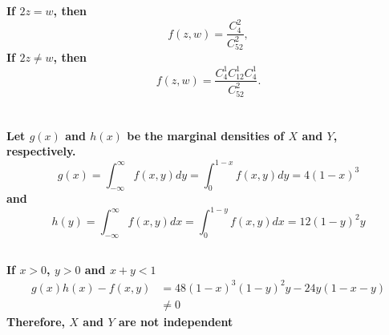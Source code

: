 \documentclass{article}
\begin{document}
    \section{}
        \subsection{}
            \paragraph{
                If $2z=w$, then 
                $$f(z,w)=\frac{C_4^2}{C_{52} ^2},$$
                If $2z \neq w$, then
                $$f(z,w)=\frac{C_4^1C_{12}^1C_4^1}{C_{52}^2}.$$
            }
    
    \section{}
        \subsection{}
            \paragraph{
                Let $g(x)$ and $h(x)$ be the marginal densities of $X$ and $Y$, respectively.
                $$g(x)=\int _{-\infty} ^\infty f(x,y) dy=\int _0 ^{1-x} f(x,y)dy=4(1-x)^3$$
                and
                $$h(y)=\int _{-\infty} ^\infty f(x,y) dx = \int _0 ^{1-y} f(x,y) dx=12(1-y)^2y$$
            }
        \subsection{}
            \paragraph{
                If $x>0$, $y>0$ and $x+y<1$
                \begin{equation}
                    \begin{split}
                        g(x)h(x)-f(x,y)
                        &= 48(1-x)^3(1-y)^2y-24y(1-x-y)\\
                        &\neq 0
                    \end{split}
                \end{equation}
                Therefore, $X$ and $Y$ are not independent
            }
    \section{}
\end{document}
